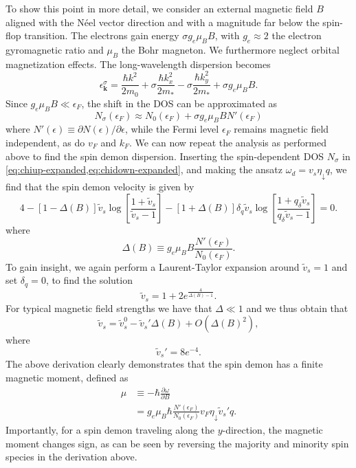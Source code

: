 \documentclass[aps,prb,reprint,twocolumns,superscriptaddress,nofootinbib]{revtex4-2}
\newcommand{\kF}{k_{F}}
\begin{document}
	To show this point in more detail, we consider an external magnetic field $B$ aligned with the N\'{e}el vector direction and with a magnitude far below the spin-flop transition. The electrons  gain energy $\sigma g_e\mu_B B$, with $g_e\approx2$ the electron gyromagnetic ratio and $\mu_B$ the Bohr magneton. We furthermore neglect orbital magnetization effects.
	The long-wavelength dispersion becomes
	\begin{equation}
		\epsilon_{\bm k}^\sigma = \frac{\hbar k^2}{2m_0} + \sigma \frac{\hbar k_x^2}{2m_*} - \sigma \frac{\hbar k_y^2}{2m_*} + \sigma g_e\mu_B B.
	\end{equation}
	Since $g_e\mu_B B\ll\epsilon_F$, the shift in the DOS can be approximated as \cite{ashcroftSolidStatePhysics1976}
	\begin{equation}
		N_\sigma(\epsilon_F)\approx N_0(\epsilon_F) +\sigma g_e\mu_B B N'(\epsilon_F) 
	\end{equation}
	where $N'(\epsilon)\equiv\partial  N(\epsilon)/\partial\epsilon$,
	while the Fermi level $\epsilon_F$ remains magnetic field independent, as do $v_F$ and $\kF$. We can now repeat the analysis as performed above to find the spin demon dispersion. Inserting the spin-dependent DOS $N_\sigma$ in \cref{eq:chiup-expanded,eq:chidown-expanded}, and making the ansatz $\omega_d=v_s \eta_\downarrow q$, we find that the spin demon velocity is given by	\begin{equation}
		4-[1-\Delta(B)]\tilde v_s\log \left[ \frac{1+\tilde v_s}{\tilde v_s-1}\right] -[1+\Delta(B)] \delta_q \tilde v_s \log \left[ \frac{1+q_\delta\tilde v_s}{q_\delta\tilde v_s-1}\right] = 0.
	\end{equation} 
	where 
	\begin{equation}
		\Delta(B)\equiv g_e\mu_B B \frac{N'(\epsilon_F) }{N_0(\epsilon_F)} . \label{eq:Delta}
	\end{equation}
	To gain insight, we again perform a Laurent-Taylor expansion around $\tilde v_s=1$ and set $\delta_q=0$, to find the solution
	\begin{equation}
		\tilde v_s = 1 + 2 e^{\frac{4}{\Delta(B)-1}}.
	\end{equation}
	For typical magnetic field strengths we have that $\Delta\ll1$ and we thus obtain that
	\begin{equation}
		\tilde v_s = \tilde v_s^0 -  \tilde v_s' \Delta(B) + O\left(\Delta(B)^2\right),
	\end{equation}
	where 
	\begin{equation}
		\tilde v_s' = 8 e^{-4}.
	\end{equation}
	The above derivation clearly demonstrates that the spin demon has a finite magnetic moment, defined as
	\begin{align}
		\mu &\equiv -\hbar \frac{\partial \omega}{\partial B} \label{eq:magnetic-moment}\\
		&=g_e\mu_B\hbar \frac{N'(\epsilon_F)}{N_0(\epsilon_F)} v_F \eta_\downarrow  \tilde v_s' q.
	\end{align}
	Importantly, for a spin demon traveling along the $y$-direction, the magnetic moment changes sign, as can be seen by reversing the majority and minority spin species in the derivation above. 
	
\end{document}

